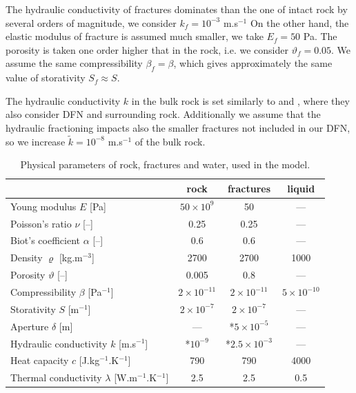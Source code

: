\documentclass{article}
\begin{document}
The hydraulic conductivity of fractures dominates than the one of intact rock by several orders of magnitude, we consider $k_f=10^{-3}$ m.s${}^{-1}$
On the other hand, the elastic modulus of fracture is assumed much smaller, we take $E_f=50$ Pa.
The porosity is taken one order higher that in the rock, i.e. we consider $\vartheta_f=0.05$.
We assume the same compressibility $\beta_f=\beta$, which gives approximately the same value of storativity $S_f\approx S$.

The hydraulic conductivity $k$ in the bulk rock is set similarly to \cite{Sperl2008} and \cite{Doonechaly2016}, where they also consider DFN and surrounding rock. Additionally we assume that the hydraulic fractioning impacts also the smaller fractures not included in our DFN, so we increase $\tilde k=10^{-8}$ m.s${}^{-1}$ of the bulk rock.

\begin{table}
\centering
\begin{tabular}{|l|c|c|c|}
\hline
 & rock & fractures & liquid\\\hline
Young modulus $E$ [Pa] & $50\times10^9$ & 50 & --- \\
Poisson's ratio $\nu$ [--] & 0.25 & 0.25 & --- \\
Biot's coefficient $\alpha$ [--] & 0.6 & 0.6 & --- \\
\hline
Density $\varrho$ [kg.m${}^{-3}$] & 2700 & 2700 & 1000 \\
Porosity $\vartheta$ [--] & 0.005 & 0.8 & --- \\
Compressibility $\beta$ [Pa${}^{-1}$] & $2\times10^{-11}$ & $2\times10^{-11}$ & $5\times10^{-10}$ \\
Storativity $S$ [m${}^{-1}$] & $2\times10^{-7}$ & $2\times10^{-7}$ & --- \\
Aperture $\delta$ [m] & --- & *$5\times10^{-5}$ & --- \\
Hydraulic conductivity $k$ [m.s${}^{-1}$] & *$10^{-9}$ & *$2.5\times10^{-3}$ & ---\\
\hline
Heat capacity $c$ [J.kg${}^{-1}$.K${}^{-1}$] & 790 & 790 & 4000 \\
Thermal conductivity $\lambda$ [W.m${}^{-1}$.K${}^{-1}$] & 2.5 & 2.5 & 0.5 \\
\hline
\end{tabular}
\caption{Physical parameters of rock, fractures and water, used in the model.}
\label{tab:params}
\end{table}

\end{document}
